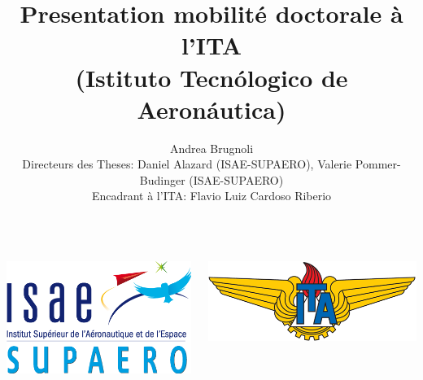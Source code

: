 \documentclass{beamer}
\title[Collaboration avec l'ITA]{Presentation mobilité doctorale à l'ITA \\ (Istituto Tecn\'ologico de Aeron\'autica)}
\author[A. Brugnoli ISAE-SUPAERO]{\small Andrea Brugnoli \\
 \footnotesize Directeurs des Theses: Daniel Alazard (ISAE-SUPAERO), Valerie Pommer-Budinger (ISAE-SUPAERO) \\
\footnotesize Encadrant à l'ITA: Flavio Luiz Cardoso Riberio}
\begin{document}
	
	
\begin{frame}
	\titlepage
\begin{columns}
	\begin{column}{0.5\textwidth}
		\centering
		\includegraphics[height=0.2\textheight]{ISAE-SUPAERO.png}
	\end{column}
	\begin{column}{0.5\textwidth}
		\centering
		\includegraphics[scale=0.3]{ITA_logo.png}
	\end{column}
\end{columns}
\end{frame}
\end{document}
